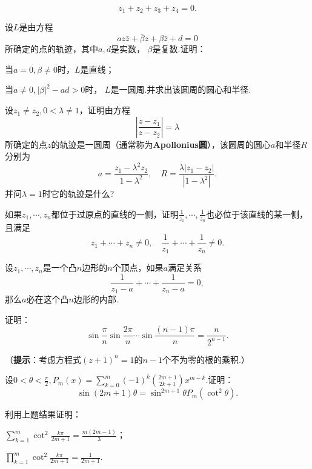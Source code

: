 \begin{xiti}
     \[
       z_1 + z_2 + z_3 + z_4 = 0.
     \]
 \item 设$L$是由方程\hypertarget{xiti1.2.14}{}
     \[
       az\bar z + \bar\beta z + \beta\bar z + d = 0
     \]
     所确定的点的轨迹，其中$a,d$是实数， $\beta$是复数.证明：
     \begin{enuma}
       \item 当$a=0,\beta\ne0$时，$L$是直线；
       \item 当$a\ne0,|\beta|^2-ad>0$时， $L$是一圆周.并求出该圆周的圆心和半径.
     \end{enuma}
 \item \hypertarget{xiti1.2.15}{}设$z_1\ne z_2,0<\lambda\ne1$，证明由方程
     \[
       \left| \frac{z-z_1}{z-z_2} \right| = \lambda
     \]
     所确定的点$z$的轨迹是一圆周（通常称为\textbf{Apollonius圆}），该圆周的圆心$a$和半径$R$分别为
     \[
       a = \frac{z_1-\lambda^2z_2}{1-\lambda^2}, \quad R = \frac{\lambda|z_1-z_2|}
       {|1-\lambda^2|}.
     \]
     并问$\lambda=1$时它的轨迹是什么?
 \item 如果$z_1,\cdots,z_n$都位于过原点的直线的一侧，证明$\frac1{z_1},\cdots,\frac1{z_n}$也必位于该直线的某一侧，且满足
     \[
       z_1 + \cdots + z_n \ne 0,\quad \frac1{z_1} + \cdots + \frac1{z_n} \ne 0.
     \]
 \item 设$z_1,\cdots,z_n$是一个凸$n$边形的$n$个顶点，如果$a$满足关系
     \[
       \frac1{z_1-a} + \cdots + \frac1{z_n-a} = 0,
     \]
     那么$a$必在这个凸$n$边形的内部.
 \item 证明：
     \[
       \sin\frac\pi n\sin\frac{2\pi}n \cdots \sin\frac{(n-1)\pi}n = \frac n{2^{n-1}}.
     \]

     （\textbf{提示}：考虑方程式$(z+1)^n=1$的$n-1$个不为零的根的乘积.）
 \item 设$0<\theta<\frac\pi2,P_m(x)=\sum_{k=0}^m(-1)^k\binom{2m+1}{2k+1}x^{m-k}$.证明：
   \[
       \sin(2m+1)\theta = \sin^{2m+1}\theta P_m(\cot^2\theta).
   \]
 \item 利用上题结果证明：
   \begin{enuma}
     \item $\sum_{k=1}^m\cot^2\frac{k\pi}{2m+1}=\frac{m(2m-1)}3$；
     \item $\prod_{k=1}^m\cot^2\frac{k\pi}{2m+1}=\frac1{2m+1}$.
   \end{enuma}
\end{xiti}

